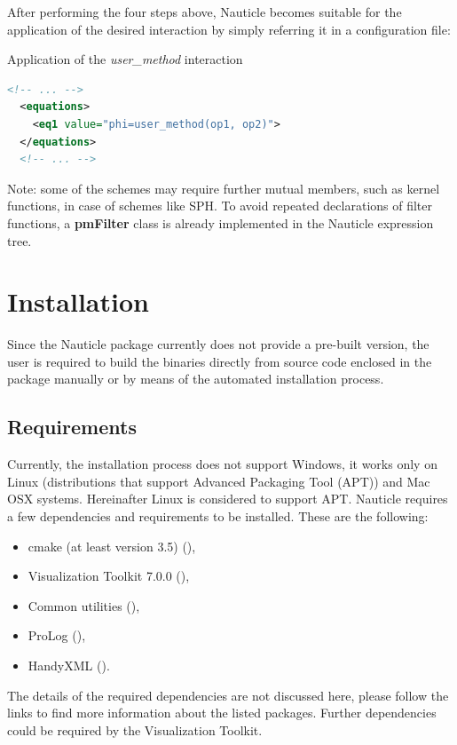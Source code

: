 \documentclass[a4paper,12pt,openany]{book}
\newcommand{\myhref}[3][nauticlegreen_dark]{\href{#2}{\color{#1}{#3}}}%
\theoremstyle{break}
\begin{document}
After performing the four steps above, Nauticle becomes suitable for the application of the desired interaction by simply referring it in a configuration file:
\begin{example}{Application of the \textit{user\_method} interaction}{}
\lstset{basicstyle=\tiny}
\begin{lstlisting}[language=XML]
  <!-- ... -->
  <equations>
    <eq1 value="phi=user_method(op1, op2)">
  </equations>
  <!-- ... -->
\end{lstlisting}
\end{example}

Note: some of the schemes may require further mutual members, such as kernel functions, in case of schemes like SPH. To avoid repeated declarations of filter functions, a \textbf{pmFilter} class is already implemented in the Nauticle expression tree.


\section{Installation}
Since the Nauticle package currently does not provide a pre-built version, the user is required to build the binaries directly from source code enclosed in the package manually or by means of the automated installation process.
\subsection{Requirements}
Currently, the installation process does not support Windows, it works only on Linux (distributions that support Advanced Packaging Tool (APT)) and Mac OSX systems. Hereinafter Linux is considered to support APT.
Nauticle requires a few dependencies and requirements to be installed. These are the following:
\begin{itemize}
  \item cmake (at least version 3.5) (\myhref{https://cmake.org/download/}{https://cmake.org/download/}),
  \item Visualization Toolkit 7.0.0 (\myhref{http://www.vtk.org/files/release/7.0/VTK-7.0.0.zip}{http://www.vtk.org/files/release/7.0/VTK-7.0.0.zip}),
  \item Common utilities (\myhref{https://bitbucket.org/BalazsToth/commonutils}{https://bitbucket.org/BalazsToth/commonutils}),
  \item ProLog (\myhref{https://bitbucket.org/BalazsToth/prolog}{https://bitbucket.org/BalazsToth/prolog}),
  \item HandyXML (\myhref{https://bitbucket.org/BalazsToth/handyxml}{https://bitbucket.org/BalazsToth/handyxml}).
\end{itemize}
The details of the required dependencies are not discussed here, please follow the links to find more information about the listed packages. Further dependencies could be required by the Visualization Toolkit.
\end{document}
